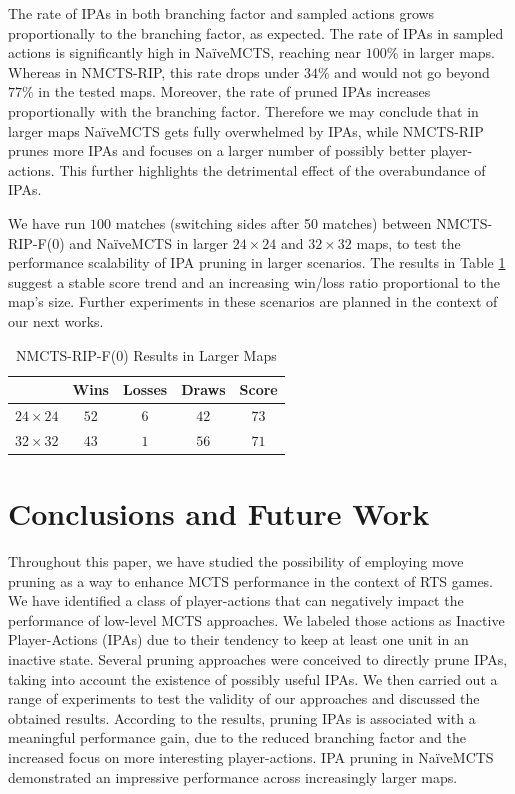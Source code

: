 \documentclass[conference]{IEEEtran}
\begin{document}
The rate of IPAs in both branching factor and sampled actions grows proportionally to the branching factor, as expected. The rate of IPAs in sampled actions is significantly high in NaïveMCTS, reaching near $100\%$ in larger maps. Whereas in NMCTS-RIP, this rate drops under $34\%$ and would not go beyond $77\%$ in the tested maps. Moreover, the rate of pruned IPAs increases proportionally with the branching factor. Therefore we may conclude that in larger maps NaïveMCTS gets fully overwhelmed by IPAs, while NMCTS-RIP prunes more IPAs and focuses on a larger number of possibly better player-actions. This further highlights the detrimental effect of the overabundance of IPAs.

We have run $100$ matches (switching sides after 50 matches) between NMCTS-RIP-F($0$) and NaïveMCTS in larger $24\times24$ and $32\times32$ maps, to test the performance scalability of IPA pruning in larger scenarios. The results in Table \ref{largeMaps} suggest a stable score trend and an increasing win/loss ratio proportional to the map's size. Further experiments in these scenarios are planned in the context of our next works.

\begin{table}[!t]
\renewcommand{\arraystretch}{1.3}
\centering
\label{largeMaps}
\caption{NMCTS-RIP-F($0$) Results in Larger Maps}
\begin{tabular}{c|c|c|c|c} 
\cline{2-5}
\multicolumn{1}{c|}{} & Wins & Losses & Draws & Score  \\ 
\hline \hline
$24\times24$ & $52$ & $6$ & $42$ & $73$ \\
$32\times32$ & $43$ & $1$ & $56$ & $71$ \\
\hline
\end{tabular}
\end{table}


\section{Conclusions and Future Work}
\label{sec:conclusions}

Throughout this paper, we have studied the possibility of employing move pruning as a way to enhance MCTS performance in the context of RTS games. We have identified a class of player-actions that can negatively impact the performance of low-level MCTS approaches. We labeled those actions as Inactive Player-Actions (IPAs) due to their tendency to keep at least one unit in an inactive state. Several pruning approaches were conceived to directly prune IPAs, taking into account the existence of possibly useful IPAs. We then carried out a range of experiments to test the validity of our approaches and discussed the obtained results. According to the results, pruning IPAs is associated with a meaningful performance gain, due to the reduced branching factor and the increased focus on more interesting player-actions. IPA pruning in NaïveMCTS demonstrated an impressive performance across increasingly larger maps.
\end{document}
